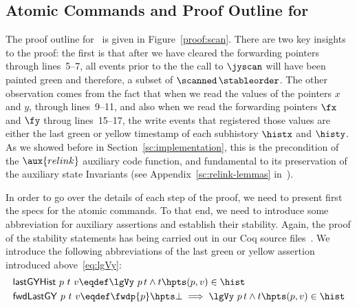 \subsection{Atomic Commands and Proof Outline for \jywrite}
\label{sc:atoms-write}

\def\botLGY{{\ensuremath{\mathsf{fwdLastGY}}}}
\def\histLGY{{\ensuremath{\mathsf{lastGYHist}}}}
\def\greenH{{\ensuremath{\mathsf{green\_prefix}}}}
\newcommand{\spz}{S_z}



The proof outline for \jyscan\ is given in
Figure~\ref{proof:scan}. There are two key insights to the proof: the
first is that after we have cleared the forwarding pointers through
lines~5--7, all events prior to the the call to $\jyscan$ will have
been painted green and therefore, a subset of $\scanned\,
\stableorder$. The other observation comes from the fact that when we
read the values of the pointers $x$ and $y$, through lines~9--11, and
also when we read the forwarding pointers $\fx$ and $\fy$ throug
lines~15--17, the write events that registered those values are either
the last green or yellow timestamp of each subhistory $\histx$ and
$\histy$. As we showed before in Section~\ref{sc:implementation}, this
is the precondition of the $\aux{relink}$ auxiliary code function, and
fundamental to its preservation of the auxiliary state Invariants (see
Appendix~\ref{sc:relink-lemmas} in~\cite{CoqFiles}).

In order to go over the details of each step of the proof, we need to
present first the specs for the atomic commands. To that end, we need
to introduce some abbreviation for auxiliary assertions and establish
their stability. Again, the proof of the stability statements has
being carried out in our Coq source files~\cite{CoqFiles}. We
introduce the following abbreviations of the last green or yellow
assertion introduced above~\eqref{eq:lgVy}:
%
\begin{align}
&\label{eq:lgVy-hist}
  \histLGY\ p\ t\ v \eqdef
    \lgVy\ p\, t \wedge t \hpts (p, v) \in \hist\\
&\label{eq:fwd-lgVy-hist}
  \botLGY\ p\ t\ v \eqdef \fwdp{p} \hpts \bot
  \implies \lgVy\ p\, t \wedge t \hpts (p, v) \in \hist
\end{align}

